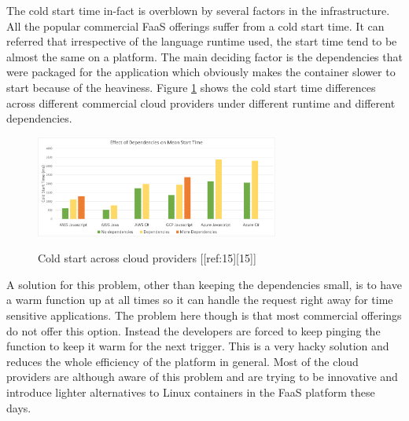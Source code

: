 \documentclass[12pt,titlepage]{article}
\begin{document}
The cold start time in-fact is overblown by several factors in the
infrastructure. All the popular commercial FaaS offerings suffer from a cold
start time. It can referred that irrespective of the language runtime used, the
start time tend to be almost the same on a platform. The main deciding factor is
the dependencies that were packaged for the application which obviously makes
the container slower to start because of the heaviness. Figure  \ref{fig:cold_strt} shows the cold
start time differences across different commercial cloud providers under
different runtime and different dependencies.

\begin{figure}[!h]
    \caption{Cold start across cloud providers [[ref:15][15]]}
    \centering
    \includegraphics[width=80mm]{./thesis_images/cold_start.png}
    \label{fig:cold_strt}
\end{figure}

A solution for this problem, other than keeping the dependencies small, is to
have a warm function up at all times so it can handle the request right away for
time sensitive applications. The problem here though is that most commercial
offerings do not offer this option. Instead the developers are forced to keep
pinging the function to keep it warm for the next trigger. This is a very hacky
solution and reduces the whole efficiency of the platform in general. Most of
the cloud providers are although aware of this problem and are trying to be
innovative and introduce lighter alternatives to Linux containers in the FaaS
platform these days.
\end{document}
